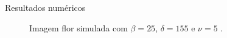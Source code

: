 \documentclass[10pt]{beamer}
\begin{document}
\begin{frame}{Resultados numéricos}
\begin{figure}[hbt]
	\caption{Imagem flor simulada com $\beta = 25$, $\delta = 155$ e $\nu = 5$ .}
\label{cap_acf_fig15}
\end{figure}
\end{frame}
\end{document}
